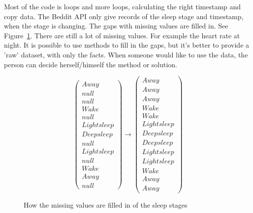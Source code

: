 
			Most of the code is loops and more loops, calculating the right timestamp and copy data. 
			The Beddit API only give records of the sleep stage and timestamp, when the stage is changing. The gaps with missing values are filled in. See Figure~\ref{fig:missingvalues}. There are still a lot of missing values. For example the heart rate at night. It is possible to use methods to fill in the gaps, but it's better to provide a 'raw' dataset, with only the facts. When someone would like to use the data, the person can decide herself/himself the method or solution.
			\begin{figure}[h!]
			\[ 
				\left(
				\begin{array}{c}
				Away \\
				null \\
				null \\
				Wake \\
				null \\
				Light sleep \\
				Deep sleep \\
				null \\
				Light sleep \\
				null \\
				Wake \\
				Away \\
				null
				\end{array}
				\right)
				\to
				\left(
				\begin{array}{c}
				Away \\
				Away \\
				Away \\
				Wake \\
				Wake \\
				Light sleep \\
				Deep sleep \\
				Deep sleep \\
				Light sleep \\
				Light sleep \\
				Wake \\
				Away \\
				Away 
				\end{array}
				\right)
			\] 
			\caption{How the missing values are filled in of the sleep stages}
			\label{fig:missingvalues}
		\end{figure}
		




